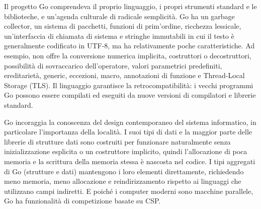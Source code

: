 Il progetto Go comprendeva il proprio linguaggio, i propri strumenti standard e le biblioteche, e un'agenda culturale di radicale semplicità.
Go ha un garbage collector, un sistema di pacchetti, funzioni di prim'ordine, ricchezza lessicale, un'interfaccia di chiamata di sistema e stringhe immutabili in cui il testo è generalmente codificato in UTF-8, ma ha relativamente poche caratteristiche.
Ad esempio, non offre la conversione numerica implicita, costruttori o decostruttori, possibilità di sovraccarico dell'operatore, valori parametrici predefiniti, ereditarietà, generic, eccezioni, macro, annotazioni di funzione e Thread-Local Storage (TLS).
Il linguaggio garantisce la retrocompatibilità: i vecchi programmi Go possono essere compilati ed eseguiti da nuove versioni di compilatori e librerie standard.

Go incoraggia la conoscenza del design contemporaneo del sistema informatico, in particolare l'importanza della località.
I suoi tipi di dati e la maggior parte delle librerie di strutture dati sono costruiti per funzionare naturalmente senza inizializzazione esplicita o un costruttore implicito, quindi l'allocazione di poca memoria e la scrittura della memoria stessa è nascosta nel codice.
I tipi aggregati di Go (strutture e dati) mantengono i loro elementi direttamente, richiedendo meno memoria, meno allocazione e reindirizzamento rispetto ai linguaggi che utilizzano campi indiretti.
E poiché i computer moderni sono macchine parallele, Go ha funzionalità di competizione basate su CSP\@.
